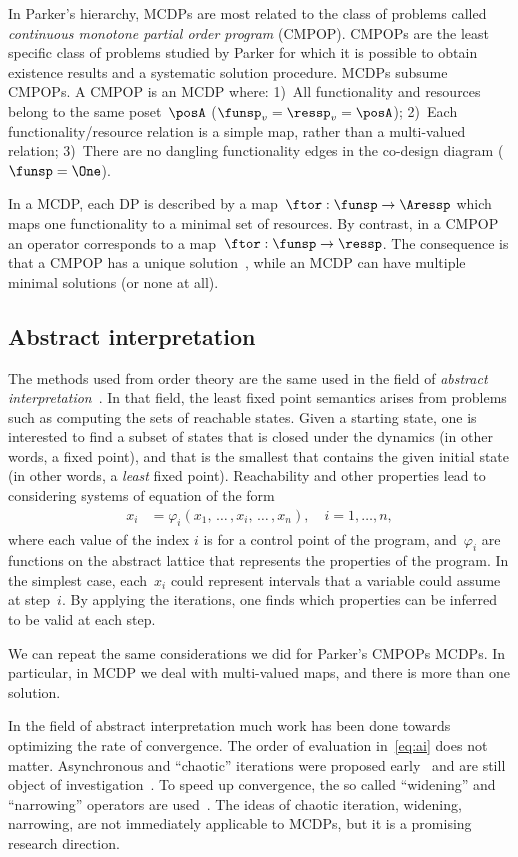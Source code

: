 In Parker's hierarchy, MCDPs are most related to the class of problems called \emph{continuous monotone partial order program} (CMPOP).
CMPOPs are the least specific class of problems studied by Parker for which it is possible to obtain existence results and a systematic solution procedure.
MCDPs subsume CMPOPs.
A CMPOP is an MCDP where: 1)~All functionality and resources belong to the same poset~$\posA$ ($\funsp_{v}=\ressp_{v}=\posA$);
2)~Each functionality/resource relation is a simple map, rather than a multi-valued relation; 3)~There are no dangling functionality edges in the co-design diagram ($\funsp=\One$).

In a MCDP, each DP is described by a \scottcontinuous map~$\ftor:\funsp\rightarrow\Aressp$
which maps one functionality to a minimal set of resources.
By contrast,
in a CMPOP an operator corresponds to a \scottcontinuous map~$\ftor:\funsp\rightarrow\ressp$.
The consequence is that a CMPOP has a unique solution~\cite[Theorem 8]{parkerjr89partial},
while an MCDP can have multiple minimal solutions (or none at all).

\subsection{Abstract interpretation}

The methods used from order theory are the same used in the field of \emph{abstract interpretation}~\cite{cousot14abstract}.
In that field, the least fixed point semantics arises from problems such as computing the sets of reachable states.
Given a starting state,
one is interested to find a subset of states that is closed under the dynamics (in other words, a fixed point), and that is the smallest that contains the given initial state (in other words, a \emph{least} fixed point).
Reachability and other properties lead to considering systems of equation of the form
\begin{align}
    x_{i} & =\varphi_{i}(x_{1},\,\dots\,,x_{i},\,\dots\,,x_{n}),\quad i=1,\dots,n,\label{eq:ai}
\end{align}
where each value of the index $i$ is for a control point of the program, and~$\varphi_{i}$ are \scottcontinuous functions on the abstract lattice that represents the properties of the program.
In the simplest case, each~$x_{i}$ could represent intervals that a variable could assume at step~$i$.
By applying the iterations, one finds which properties can be inferred to be valid at each step.

We can repeat the same considerations we did for Parker's CMPOPs \vs MCDPs.
In particular, in MCDP we deal with multi-valued maps, and there is more than one solution.

In the field of abstract interpretation much work has been done towards optimizing the rate of convergence.
The order of evaluation in~\cref{eq:ai} does not matter.
Asynchronous and ``chaotic'' iterations were proposed early~\cite{cousot77asynchronous} and are still object of investigation~\cite{bourdoncleefficient}.
To speed up convergence, the so called ``widening'' and ``narrowing'' operators are used~\cite{cortesi11widening}.
The ideas of chaotic iteration, widening, narrowing, are not immediately applicable to MCDPs, but it is a promising research direction.


